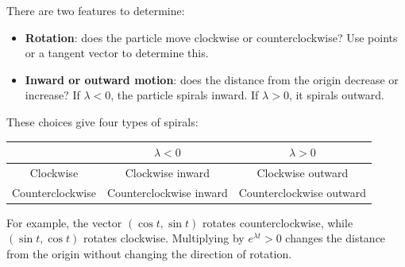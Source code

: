 \documentclass[11pt,letterpaper]{article}
\begin{document}
There are two features to determine:
\begin{itemize}
    \item \textbf{Rotation}: does the particle move
    clockwise or counterclockwise?
    Use points or a tangent vector to determine this.

    \item \textbf{Inward or outward motion}:
    does the distance from the origin decrease or increase?
    If $\lambda<0$, the particle spirals inward.
    If $\lambda>0$, it spirals outward.
\end{itemize}
These choices give four types of spirals:
\begin{center}
\begin{tabular}{c|cc}
 & $\lambda<0$ & $\lambda>0$\\
\hline
Clockwise & Clockwise inward & Clockwise outward\\
Counterclockwise & Counterclockwise inward
& Counterclockwise outward
\end{tabular}
\end{center}

For example, the vector $(\cos t,\sin t)$ rotates
counterclockwise, while $(\sin t,\cos t)$ rotates
clockwise. Multiplying by $e^{\lambda t}>0$ changes
the distance from the origin without changing
the direction of rotation.
\end{document}
